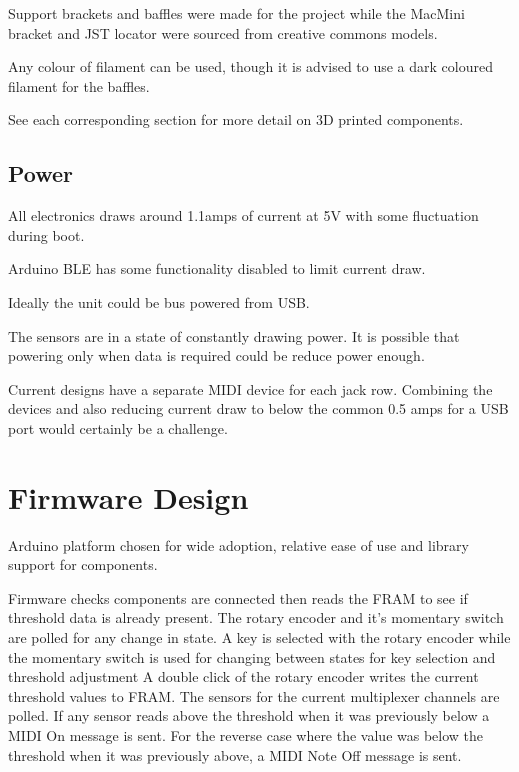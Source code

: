 Support brackets and baffles were made for the project while the MacMini
bracket and JST locator were sourced from creative commons models.

Any colour of filament can be used, though it is advised to use a dark
coloured filament for the baffles.

See each corresponding section for more detail on 3D printed components.

\subsection{Power}\label{power}

All electronics draws around 1.1amps of current at 5V with some
fluctuation during boot.

Arduino BLE has some functionality disabled to limit current draw.

Ideally the unit could be bus powered from USB.

The sensors are in a state of constantly drawing power. It is possible
that powering only when data is required could be reduce power enough.

Current designs have a separate MIDI device for each jack row. Combining
the devices and also reducing current draw to below the common 0.5 amps
for a USB port would certainly be a challenge.

\section{Firmware Design}\label{firmware-design}

Arduino platform chosen for wide adoption, relative ease of use and
library support for components.

Firmware checks components are connected then reads the FRAM to see if
threshold data is already present. The rotary encoder and it's momentary
switch are polled for any change in state. A key is selected with the
rotary encoder while the momentary switch is used for changing between
states for key selection and threshold adjustment A double click of the
rotary encoder writes the current threshold values to FRAM. The sensors
for the current multiplexer channels are polled. If any sensor reads
above the threshold when it was previously below a MIDI On message is
sent. For the reverse case where the value was below the threshold when
it was previously above, a MIDI Note Off message is sent.


